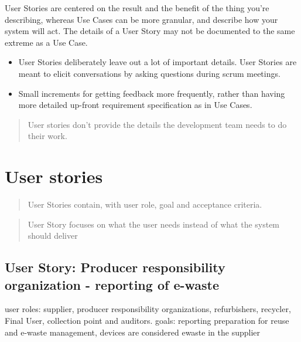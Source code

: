 \documentclass[
]{book}
\begin{document}
User Stories are centered on the result and the benefit of the thing you're describing, whereas Use Cases can be more granular, and describe how your system will act. The details of a User Story may not be documented to the same extreme as a Use Case.

\begin{itemize}
\item
  User Stories deliberately leave out a lot of important details. User Stories are meant to elicit conversations by asking questions during scrum meetings.
\item
  Small increments for getting feedback more frequently, rather than having more detailed up-front requirement specification as in Use Cases.
\end{itemize}

\begin{quote}
User stories don't provide the details the development team needs to do their work.
\end{quote}

\hypertarget{user-stories}{%
\section{User stories}\label{user-stories}}

\begin{quote}
User Stories contain, with user role, goal and acceptance criteria.
\end{quote}

\begin{quote}
User Story focuses on what the user needs instead of what the system should deliver
\end{quote}

\hypertarget{user-story-producer-responsibility-organization---reporting-of-e-waste}{%
\subsection{User Story: Producer responsibility organization - reporting of e-waste}\label{user-story-producer-responsibility-organization---reporting-of-e-waste}}

user roles: supplier, producer responsibility organizations, refurbishers, recycler, Final User, collection point and auditors.
goals: reporting preparation for reuse and e-waste management, devices are considered ewaste in the supplier
\end{document}
